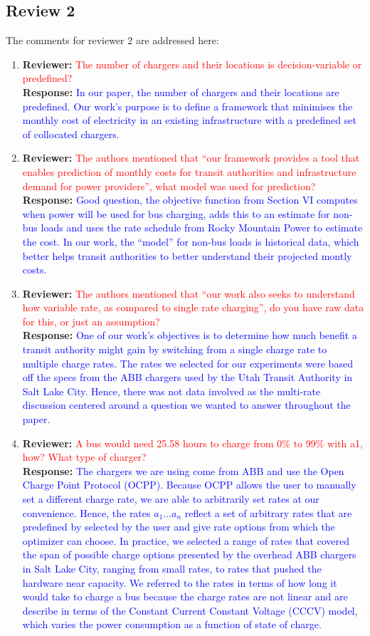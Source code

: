 \documentclass{article}
\newcommand\formatfeedback[2]
{%
	\textbf{Reviewer:} \textcolor{red}{#1} 
	\\[0.1in] \textbf{Response:} \textcolor{blue}{#2}
}
\begin{document}
\subsection*{Review 2}
The comments for reviewer 2 are addressed here:
\begin{enumerate}
	\item \formatfeedback{The number of chargers and their locations is decision-variable or predefined?}%
			     {In our paper, the number of chargers and their locations are predefined. Our work's purpose is to define a framework that minimises the monthly cost of electricity in an existing infrastructure with a predefined set of collocated chargers.} 
	\item \formatfeedback{The authors mentioned that “our framework provides a tool that enables prediction of monthly costs for transit authorities and infrastructure demand for power providers”, what model was used for prediction?}%
			     {Good question, the objective function from Section VI computes when power will be used for bus charging, adds this to an estimate for non-bus loads and uses the rate schedule from Rocky Mountain Power to estimate the cost. In our work, the ``model'' for non-bus loads is historical data, which better helps transit authorities to better understand their projected montly costs.} 
	\item \formatfeedback{The authors mentioned that “our work also seeks to understand how variable rate, as compared to single rate charging”, do you have raw data for this, or just an assumption?}%
			     {One of our work's objectives is to determine how much benefit a transit authority might gain by switching from a single charge rate to multiple charge rates. The rates we selected for our experiments were based off the specs from the ABB chargers used by the Utah Transit Authority in Salt Lake City. Hence, there was not data involved as the multi-rate discussion centered around a question we wanted to answer throughout the paper.} 
	\item \formatfeedback{A bus would need 25.58 hours to charge from 0\% to 99\% with a1, how? What type of charger?}%
		{The chargers we are using come from ABB and use the Open Charge Point Protocol (OCPP). Because OCPP allows the user to manually set a different charge rate, we are able to arbitrarily set rates at our convenience. Hence, the rates $a_1 \hdots a_n$ reflect a set of arbitrary rates that are predefined by selected by the user and give rate options from which the optimizer can choose. In practice, we selected a range of rates that covered the span of possible charge options presented by the overhead ABB chargers in Salt Lake City, ranging from small rates, to rates that pushed the hardware near capacity.  We referred to the rates in terms of how long it would take to charge a bus because the charge rates are not linear and are describe in terms of the Constant Current Constant Voltage (CCCV) model, which varies the power consumption as a function of state of charge.} 

\end{enumerate}
\end{document}
